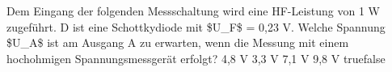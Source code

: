     {Dem Eingang der folgenden Messschaltung wird eine HF-Leistung von 1 W zugeführt. D ist eine Schottkydiode mit \$U\_F\$ = 0,23 V. Welche Spannung \$U\_A\$ ist am Ausgang A zu erwarten, wenn die Messung mit einem hochohmigen Spannungsmessgerät erfolgt?}
    {4,8 V}
    {3,3 V}
    {7,1 V}
    {9,8 V}
    {true}{false}